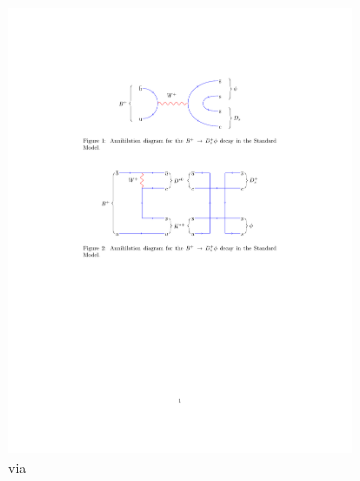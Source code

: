 \begin{figure}[!h]
    \centering
    \begin{subfigure}[m]{0.6\textwidth}
        \centering
        \includegraphics[width=1.0\textwidth]{figs/Theory/B2DsPhi_Rescattering_B2D0K.pdf}
        \caption{via \decay{\Bp}{\Dstarz\Kstarp}}
        \label{fig:theory_rescattering_DK}
    \end{subfigure}
    \begin{subfigure}[m]{0.6\textwidth}
        \centering

\end{subfigure}
\end{figure}
